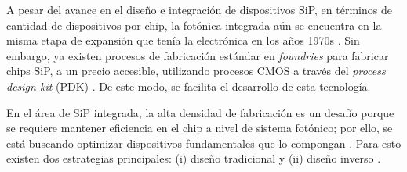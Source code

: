
A pesar del avance en el diseño e integración de dispositivos SiP, en términos
de cantidad de dispositivos por chip, la fotónica integrada aún se encuentra en la misma etapa de expansión que tenía la
electrónica en los años 1970s \citep{LukasChrostowski2010}.
Sin embargo, ya existen procesos de fabricación estándar en \emph{foundries}
para fabricar chips SiP, a un precio accesible, utilizando procesos CMOS
a través del \emph{process design kit} (PDK) \citep{Bogaerts2018}.
De este modo, se facilita el desarrollo de esta tecnología.


En el área de SiP integrada, la alta densidad de fabricación es un desafío
porque se requiere mantener eficiencia en el chip a nivel de sistema fotónico;
por ello, se está buscando optimizar dispositivos fundamentales que lo compongan \citep{Vuckovic2019}.
Para esto existen dos estrategias principales: (i) diseño tradicional
\citep{Hughes2016, Song2008, Huang2018} y (ii) diseño inverso \citep{Malheiros-Silveira2020, Gregory2015, Su2020}.


